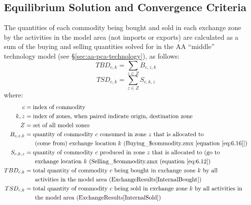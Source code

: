 \subsection{Equilibrium Solution and Convergence Criteria}

The quantities of each commodity being bought and sold in each exchange zone by the activities in the model area (not imports or exports) are calculated as a sum of the buying and selling quantities solved for in the AA ``middle'' technology model (see \S\ref{sec:aa-pca-technology}), as follows:
\begin{equation}\label{eq:6.30}
TBD_{c,k} = \sum_{z \in Z} B_{c,z,k}
\end{equation}
\begin{equation}\label{eq:6.31}
TSD_{c,k} = \sum_{z \in Z} S_{c,k,z}
\end{equation}
\noindent where:
\begin{align*}
c &= \text{index of commodity} \\
k, z &= \text{index of zones, when paired indicate origin, destination zone} \\
Z &= \text{set of all model zones} \\
B_{c,z,k} &= \text{quantity of commodity $c$ consumed in zone $z$ that is allocated to} \\
 &~~~~~\text{(come from) exchange location $k$ (Buying\_\$commodity.zmx [equation \ref{eq:6.16}])} \\
S_{c,k,z} &= \text{quantity of commodity $c$ produced in zone $z$ that is allocated to (go to} \\
 &~~~~~\text{exchange location $k$ (Selling\_\$commodity.zmx (equation \ref{eq:6.12})} \\
TBD_{c,k} &= \text{total quantity of commodity $c$ being bought in exchange zone $k$ by all} \\
 &~~~~~\text{activities in the model area (ExchangeResults[InternalBought])} \\
TSD_{c,k} &= \text{total quantity of commodity $c$ being sold in exchange zone $k$ by all activities in} \\
 &~~~~~\text{the model area (ExchangeResults[InternalSold])}
\end{align*}

